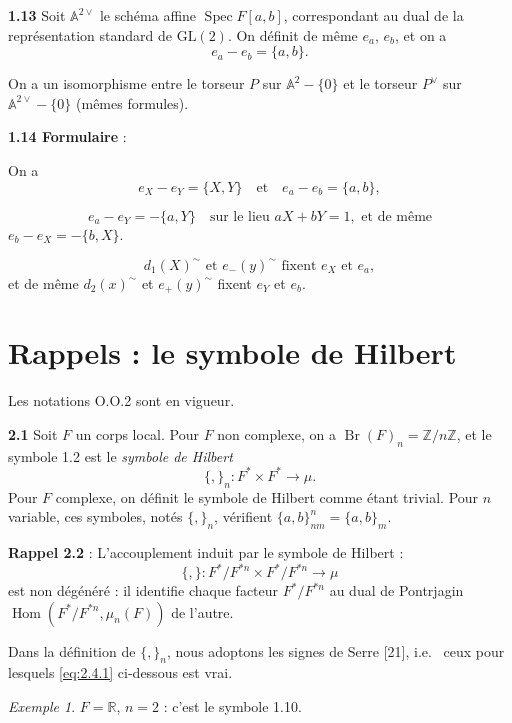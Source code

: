 \documentclass[12pt,a4paper]{article}
\theoremstyle{plain}
\theoremstyle{definition}
\theoremstyle{remark}
\newtheorem{example}[theorem]{Exemple}
\DeclareMathOperator{\Hom}{Hom}
\DeclareMathOperator{\Br}{Br}
\newcommand{\RR}{\mathbb{R}}
\newcommand{\ZZ}{\mathbb{Z}}
\providecommand{\AA}{\mathbb{A}}
\providecommand{\RR}{\mathbb{R}}
\providecommand{\ZZ}{\mathbb{Z}}
\providecommand{\Hom}{\operatorname{Hom}}
\providecommand{\Spec}{\operatorname{Spec}}
\begin{document}
\textbf{1.13} Soit $\AA^{2\vee}$ le schéma affine $\Spec F[a, b]$, correspondant au dual de la représentation standard de $\mathrm{GL}(2)$. On définit de même $e_a$, $e_b$, et on a
\[
e_a - e_b = \{a, b\}.
\]

On a un isomorphisme entre le torseur $P$ sur $\AA^2 - \{0\}$ et le torseur $P^\vee$ sur $\AA^{2\vee} - \{0\}$ (mêmes formules).

\textbf{1.14 Formulaire} :

On a
\begin{equation}\label{eq:1.14.1}
e_X - e_Y = \{X, Y\} \quad \text{et} \quad e_a - e_b = \{a, b\},
\tag{1.14.1}
\end{equation}

\begin{equation}\label{eq:1.14.2}
e_a - e_Y = -\{a, Y\} \quad \text{sur le lieu } aX + bY = 1, \text{ et de même}
\tag{1.14.2}
\end{equation}
$e_b - e_X = -\{b, X\}$.

\begin{equation}\label{eq:1.14.3}
d_1(X)^\sim \text{ et } e_-(y)^\sim \text{ fixent } e_X \text{ et } e_a,
\tag{1.14.3}
\end{equation}
et de même $d_2(x)^\sim$ et $e_+(y)^\sim$ fixent $e_Y$ et $e_b$.


\section{Rappels : le symbole de Hilbert}

Les notations O.O.2 sont en vigueur.

\textbf{2.1} Soit $F$ un corps local. Pour $F$ non complexe, on a $\Br(F)_n = \ZZ/n\ZZ$, et le symbole 1.2 est le \emph{symbole de Hilbert}
\[
\{,\}_n : F^* \times F^* \longrightarrow \mu.
\]
Pour $F$ complexe, on définit le symbole de Hilbert comme étant trivial. Pour $n$ variable, ces symboles, notés $\{,\}_n$, vérifient $\{a, b\}_{nm}^n = \{a, b\}_m$.

\textbf{Rappel 2.2} : L'accouplement induit par le symbole de Hilbert :
\[
\{,\} : F^*/F^{*n} \times F^*/F^{*n} \longrightarrow \mu
\]
est non dégénéré : il identifie chaque facteur $F^*/F^{*n}$ au dual de Pontrjagin $\Hom(F^*/F^{*n}, \mu_n(F))$ de l'autre.

Dans la définition de $\{,\}_n$, nous adoptons les signes de Serre [21], i.e.
\ ceux pour lesquels \eqref{eq:2.4.1} ci-dessous est vrai.

\begin{example}
$F = \RR$, $n = 2$ : c'est le symbole 1.10.
\end{example}
\end{document}
